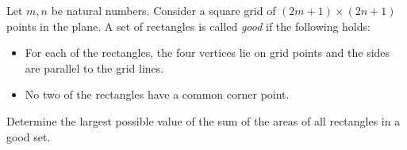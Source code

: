 Let $m,n$ be natural numbers. Consider a square grid of $(2m+1) \times (2n+1)$ points in the plane.
A set of rectangles is called \emph{good} if the following holds:
\begin{itemize}
    \item For each of the rectangles, the four vertices lie on grid points and
    the sides are parallel to the grid lines.
    \item No two of the rectangles have a common corner point.
\end{itemize}
Determine the largest possible value of the sum of the areas of all rectangles in a good set.
